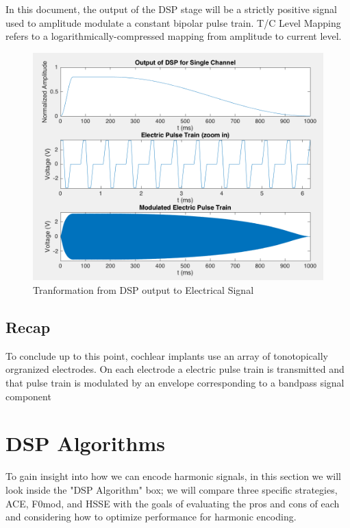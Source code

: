 \documentclass [11pt, proquest] {uwthesis}[2015/03/03]
\begin{document}
In this document, the output of the DSP stage will be a strictly positive signal used to amplitude modulate a constant bipolar pulse train.  T/C Level Mapping refers to a logarithmically-compressed mapping from amplitude to current level.

\begin{figure}[!ht]
  \centering
    \includegraphics[width=1.0\textwidth]{output_of_dsp}   
    \caption{Tranformation from DSP output to Electrical Signal}\label{fig:output_of_dsp}
\end{figure}

\subsection{Recap}

To conclude up to this point, cochlear implants use an array of tonotopically orgranized electrodes.  On each electrode a electric pulse train is transmitted and that pulse train is modulated by an envelope corresponding to a bandpass signal component

\section{DSP Algorithms}

To gain insight into how we can encode harmonic signals, in this section we will look inside the "DSP Algorithm" box; we will compare three specific strategies, ACE, F0mod, and HSSE with the goals of evaluating the pros and cons of each and considering how to optimize performance for harmonic encoding.
\end{document}
